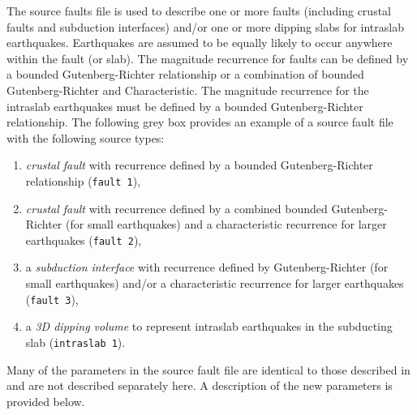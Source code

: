 The source faults file is used to describe one or more faults
(including crustal faults and subduction interfaces) and/or one or
more dipping slabs for intraslab earthquakes. Earthquakes are
assumed to be equally likely to occur anywhere within the fault (or
slab). The magnitude recurrence for faults can be defined by a
bounded Gutenberg-Richter relationship or a combination of bounded
Gutenberg-Richter and Characteristic. The magnitude recurrence for the
intraslab earthquakes must be defined by a bounded Gutenberg-Richter
relationship. The following grey box provides an example of a source
fault file with the following source types:
\begin{enumerate}

\item \textit{crustal fault} with recurrence defined by a bounded
  Gutenberg-Richter relationship (\texttt{fault 1}),

\item \textit{crustal fault} with recurrence defined by a combined
  bounded Gutenberg-Richter (for small earthquakes) and a
  characteristic recurrence for larger earthquakes (\texttt{fault 2}),

\item a \textit{subduction interface} with recurrence defined by
  Gutenberg-Richter (for small earthquakes) and/or a characteristic
  recurrence for larger earthquakes (\texttt{fault 3}),

\item a \textit{3D dipping volume} to represent intraslab earthquakes
  in the subducting slab (\texttt{intraslab 1}).

\end{enumerate}
Many of the parameters in the source fault file are identical to
those described in  and are not described
separately here. A description of the new parameters is provided
below.

%


